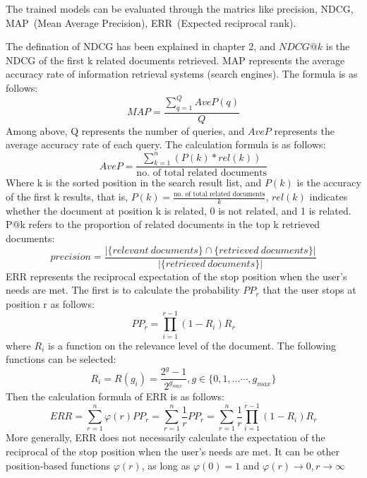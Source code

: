 The trained models can be evaluated through the matrics like precision, NDCG, MAP~(Mean Average Precision), ERR~(Expected reciprocal rank).

The defination of NDCG has been explained in chapter 2, and $NDCG@k$ is the NDCG of the first k related documents retrieved. MAP represents the average accuracy rate of information retrieval systems (search engines). The formula is as follows:
\begin{equation}
MAP = \frac {\sum_{q=1}^Q AveP(q)}{Q}
\end{equation}
Among above, Q represents the number of queries, and $AveP$ represents the average accuracy rate of each query. The calculation formula is as follows:
\begin{equation}
AveP = \frac{\sum_{k=1}^n(P(k)*rel(k))}{\text{no. of total related documents}}
\end{equation}
Where k is the sorted position in the search result list, and $P(k)$ is the accuracy of the first k results, that is, $P(k) = \frac{\text{no. of total related documents}}{k}$, $rel(k)$ indicates whether the document at position k is related, 0 is not related, and 1 is related. P@k refers to the proportion of related documents in the top k retrieved documents:
\begin{equation}
precision=\frac{|\{relevant\ documents\} \cap \{retrieved\ documents\}|}{|\{retrieved\ documents\}|}
\end{equation}
ERR represents the reciprocal expectation of the stop position when the user's needs are met. The first is to calculate the probability $PP_r$ that the user stops at position r as follows:
\begin{equation}
PP_r=\prod_{i=1}^{r-1}(1-R_i)R_r
\end{equation}
where $R_i$ is a function on the relevance level of the document. The following functions can be selected:
\begin{equation}
R_i=R( g_i )=\frac{2^g - 1}{2^{g_{max}}}, g\in\{0,1,\ldots \cdots,g_{max}\}
\end{equation}
Then the calculation formula of ERR is as follows:
\begin{equation}
ERR =\sum_{r=1}^n\varphi(r)  PP_r= \sum_{r=1}^n \frac{1}{r} PP_r =\sum_{r=1}^n \frac{1}{r} \prod_{i=1}^{r-1}(1-R_i )R_r
\end{equation}
More generally, ERR does not necessarily calculate the expectation of the reciprocal of the stop position when the user's needs are met. It can be other position-based functions $\varphi(r)$, as long as $\varphi(0) = 1$ and $\varphi (r) \rightarrow 0,r\rightarrow \infty $
